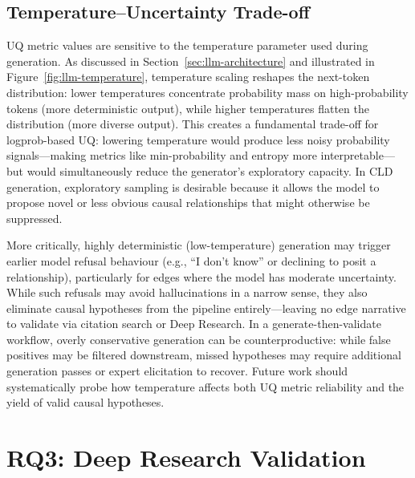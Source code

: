 \subsection{Temperature--Uncertainty Trade-off}

UQ metric values are sensitive to the temperature parameter used during generation. As discussed in Section~\ref{sec:llm-architecture} and illustrated in Figure~\ref{fig:llm-temperature}, temperature scaling reshapes the next-token distribution: lower temperatures concentrate probability mass on high-probability tokens (more deterministic output), while higher temperatures flatten the distribution (more diverse output). This creates a fundamental trade-off for logprob-based UQ: lowering temperature would produce less noisy probability signals---making metrics like min-probability and entropy more interpretable---but would simultaneously reduce the generator's exploratory capacity. In CLD generation, exploratory sampling is desirable because it allows the model to propose novel or less obvious causal relationships that might otherwise be suppressed.

More critically, highly deterministic (low-temperature) generation may trigger earlier model refusal behaviour (e.g., ``I don't know'' or declining to posit a relationship), particularly for edges where the model has moderate uncertainty. While such refusals may avoid hallucinations in a narrow sense, they also eliminate causal hypotheses from the pipeline entirely---leaving no edge narrative to validate via citation search or Deep Research. In a generate-then-validate workflow, overly conservative generation can be counterproductive: while false positives may be filtered downstream, missed hypotheses may require additional generation passes or expert elicitation to recover. Future work should systematically probe how temperature affects both UQ metric reliability and the yield of valid causal hypotheses.

\section{RQ3: Deep Research Validation}
\label{sec:discussion_rq3}
\label{sec:rq3_pivot}
\label{sec:discussion_rq3_original_design}

